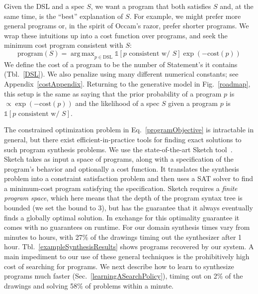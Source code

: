 \documentclass{article}
\DeclareMathOperator*{\argmin}{arg\,min} %
\DeclareMathOperator*{\argmax}{arg\,max} %
\newcommand{\indicator}{\mathds{1}} %
\newcommand{\remark}[1]{\textcolor{red}{[#1]}}
\theoremstyle{definition}
\begin{document}
Given the DSL and a spec $S$, we want a program that both satisfies $S$
and, at the same time, is the ``best'' explanation of $S$.
For example, we might prefer more general programs or, in the spirit of Occam's razor,
prefer shorter programs.
We wrap these intuitions up into a cost function over programs,
and seek the minimum cost program consistent with $S$:
\begin{equation}
    \text{program}(S) = \argmax_{p\in \text{DSL}} \indicator\left[p \text{ consistent w/ } S \right]\exp \left( -\text{cost}(p) \right)\label{programObjective}
\end{equation}
We define the
cost of a program to be the number of Statement's it contains (Tbl.~\ref{DSL}).
We also penalize using many different numerical constants; see Appendix~\ref{costAppendix}.
Returning to the generative model in Fig.~\ref{roadmap},
this setup is the same as saying that the prior probability of a program $p$ is $\propto \exp\left(-\text{cost}(p) \right)$ and the likelihood of a spec $S$ given a program $p$ is $\indicator[p\text{ consistent w/ }S]$.

The constrained optimization problem in
Eq.~\ref{programObjective} is intractable in general, but there
exist efficient-in-practice tools for finding exact solutions to such
program synthesis problems. We use the state-of-the-art Sketch
tool~\citep{solar2008program}.
Sketch takes as input a space of programs, along with
a specification of the program's behavior and optionally a cost
function.  It translates the synthesis problem into a constraint
satisfaction problem and then uses a SAT solver to find a minimum-cost
program satisfying the specification.  Sketch requires a
 \emph{finite program space}, which here means that the depth of the
program syntax tree is bounded (we set the bound to 3),
but has the guarantee that it 
always eventually finds a globally optimal solution.
In exchange for this optimality guarantee
it comes with no guarantees
on runtime.
For our domain synthesis times vary from minutes to hours,
with 27\% of the drawings timing out the synthesizer after 1 hour.
Tbl.~\ref{exampleSynthesisResults} shows programs recovered by our system.
A main impediment to our use of these general techniques is
the prohibitively high cost of searching for programs.
We next describe how to learn to synthesize programs much faster (Sec.~\ref{learningASearchPolicy}),
timing out on 2\% of the drawings and solving 58\% of problems within a minute.
\end{document}
